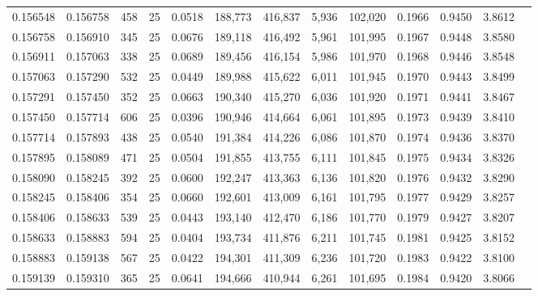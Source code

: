 \begin{tabular}{rrrrrrrrrrrrr}
0.156548 & 0.156758 &   458 &  25 &                                     0.0518 & 188,773 & 416,837 &   5,936 & 102,020 & 0.1966 & 0.9450 & 3.8612 \\
0.156758 & 0.156910 &   345 &  25 &                                     0.0676 & 189,118 & 416,492 &   5,961 & 101,995 & 0.1967 & 0.9448 & 3.8580 \\
0.156911 & 0.157063 &   338 &  25 &                                     0.0689 & 189,456 & 416,154 &   5,986 & 101,970 & 0.1968 & 0.9446 & 3.8548 \\
0.157063 & 0.157290 &   532 &  25 &                                     0.0449 & 189,988 & 415,622 &   6,011 & 101,945 & 0.1970 & 0.9443 & 3.8499 \\
0.157291 & 0.157450 &   352 &  25 &                                     0.0663 & 190,340 & 415,270 &   6,036 & 101,920 & 0.1971 & 0.9441 & 3.8467 \\
0.157450 & 0.157714 &   606 &  25 &                                     0.0396 & 190,946 & 414,664 &   6,061 & 101,895 & 0.1973 & 0.9439 & 3.8410 \\
0.157714 & 0.157893 &   438 &  25 &                                     0.0540 & 191,384 & 414,226 &   6,086 & 101,870 & 0.1974 & 0.9436 & 3.8370 \\
0.157895 & 0.158089 &   471 &  25 &                                     0.0504 & 191,855 & 413,755 &   6,111 & 101,845 & 0.1975 & 0.9434 & 3.8326 \\
0.158090 & 0.158245 &   392 &  25 &                                     0.0600 & 192,247 & 413,363 &   6,136 & 101,820 & 0.1976 & 0.9432 & 3.8290 \\
0.158245 & 0.158406 &   354 &  25 &                                     0.0660 & 192,601 & 413,009 &   6,161 & 101,795 & 0.1977 & 0.9429 & 3.8257 \\
0.158406 & 0.158633 &   539 &  25 &                                     0.0443 & 193,140 & 412,470 &   6,186 & 101,770 & 0.1979 & 0.9427 & 3.8207 \\
0.158633 & 0.158883 &   594 &  25 &                                     0.0404 & 193,734 & 411,876 &   6,211 & 101,745 & 0.1981 & 0.9425 & 3.8152 \\
0.158883 & 0.159138 &   567 &  25 &                                     0.0422 & 194,301 & 411,309 &   6,236 & 101,720 & 0.1983 & 0.9422 & 3.8100 \\
0.159139 & 0.159310 &   365 &  25 &                                     0.0641 & 194,666 & 410,944 &   6,261 & 101,695 & 0.1984 & 0.9420 & 3.8066 \\

\end{tabular}
